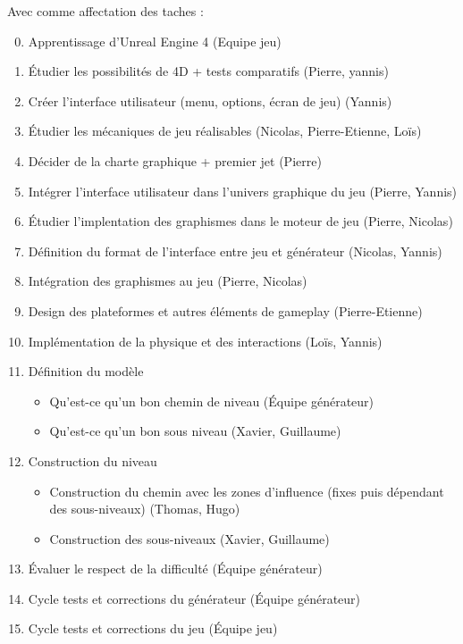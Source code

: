 \documentclass[12pt]{article}
\begin{document}
        Avec comme affectation des taches :
        \begin{enumerate}
            \setcounter{enumi}{-1}
            \item Apprentissage d'Unreal Engine 4 (Equipe jeu)
            \item \'Etudier les possibilités de 4D + tests comparatifs (Pierre, yannis)
            \item Créer l'interface utilisateur (menu, options, écran de jeu) (Yannis)
            \item \'Etudier les mécaniques de jeu réalisables (Nicolas, Pierre-Etienne, Loïs)
            \item Décider de la charte graphique + premier jet (Pierre)
            \item Intégrer l'interface utilisateur dans l'univers graphique du jeu (Pierre, Yannis)
            \item \'Etudier l'implentation des graphismes dans le moteur de jeu (Pierre, Nicolas)
            \item Définition du format de l'interface entre jeu et générateur (Nicolas, Yannis)
            \item Intégration des graphismes au jeu (Pierre, Nicolas)
            \item Design des plateformes et autres éléments de gameplay (Pierre-Etienne)
            \item Implémentation de la physique et des interactions (Loïs, Yannis)
            \item Définition du modèle
                \begin{itemize}
        \renewcommand{\labelitemi}{$\bullet$}
                    \item Qu'est-ce qu'un bon chemin de niveau (\'Equipe générateur)
                    \item Qu'est-ce qu'un bon sous niveau (Xavier, Guillaume)
                \end{itemize}
            \item Construction du niveau
                \begin{itemize}
        \renewcommand{\labelitemi}{$\bullet$}
                    \item Construction du chemin avec les zones d'influence (fixes puis dépendant des sous-niveaux) (Thomas, Hugo)
                    \item Construction des sous-niveaux (Xavier, Guillaume)
                \end{itemize}
            \item \'Evaluer le respect de la difficulté (\'Equipe générateur)
            \item Cycle tests et corrections du générateur (\'Equipe générateur)
            \item Cycle tests et corrections du jeu (\'Equipe jeu)
        \end{enumerate}
        
\end{document}
